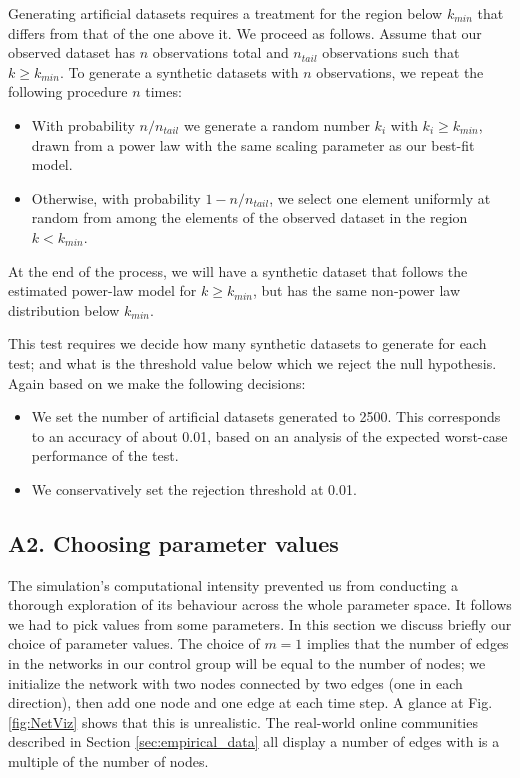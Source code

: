 \documentclass{bmcart}
\begin{document}
Generating artificial datasets requires a treatment for the region below $k_{min}$  that differs from that of the one above it. We proceed as follows. Assume that our observed dataset has $n$ observations total and $n_{tail}$ observations such that $k \geq k_{min}$. To generate a synthetic datasets with $n$ observations, we repeat the following procedure $n$ times:
\begin{itemize}
\item With probability $n/n_{tail}$ we generate a random number $k_i$ with $k_i \geq k_{min}$, drawn from a power law with the same scaling parameter as our best-fit model.
\item Otherwise, with probability $1 - n/n_{tail}$, we select one element uniformly at random from among the elements of the observed dataset in the region $k<k_{min}$.
\end{itemize}

At the end of the process, we will have a synthetic dataset that follows the estimated power-law model for $k \geq k_{min}$, but has the same non-power law distribution below $k_{min}$.

This test requires we decide how many synthetic datasets to generate for each test; and what is the threshold value below which we reject the null hypothesis. Again based on \cite{clauset2009power} we make the following decisions:

\begin{itemize}
\item We set the number of artificial datasets generated to 2500. This corresponds to an accuracy of about 0.01, based on an analysis of the expected worst-case performance of the test. 
\item We conservatively set the rejection threshold at 0.01.
\end{itemize}

\subsection*{A2. Choosing parameter values}

The simulation's computational intensity prevented us from conducting a thorough exploration of its behaviour across the whole parameter space. It follows we had to pick values from some parameters. In this section we discuss briefly our choice of parameter values.
The choice of $m=1$ implies that the number of edges in the networks in our control group will be equal to the number of nodes; we initialize the network with two nodes connected by two edges (one in each direction), then add one node and one edge at each time step. A glance at  Fig.\,\ref{fig:NetViz} shows that this is unrealistic. The real-world online communities described in Section \ref{sec:empirical_data} all display a number of edges with is a multiple of the number of nodes. 
\end{document}
